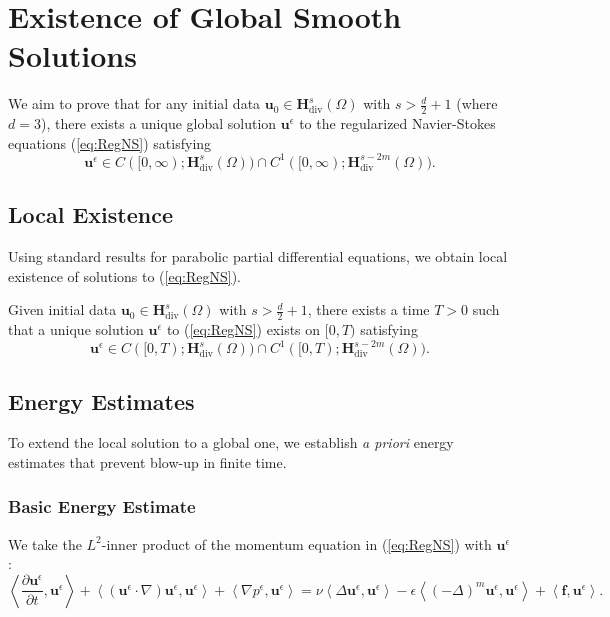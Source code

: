 \documentclass[11pt]{article}
\begin{document}
\section{Existence of Global Smooth Solutions}

We aim to prove that for any initial data $\mathbf{u}_0 \in \mathbf{H}^s_{\text{div}}(\Omega)$ with $s > \frac{d}{2} + 1$ (where $d=3$), there exists a unique global solution $\mathbf{u}^\epsilon$ to the regularized Navier-Stokes equations (\ref{eq:RegNS}) satisfying
\begin{equation}
\mathbf{u}^\epsilon \in C([0, \infty); \mathbf{H}^s_{\text{div}}(\Omega)) \cap C^1([0, \infty); \mathbf{H}^{s - 2m}_{\text{div}}(\Omega)).
\end{equation}

\subsection{Local Existence}

Using standard results for parabolic partial differential equations, we obtain local existence of solutions to (\ref{eq:RegNS}).

\begin{theorem}
Given initial data $\mathbf{u}_0 \in \mathbf{H}^s_{\text{div}}(\Omega)$ with $s > \frac{d}{2} + 1$, there exists a time $T > 0$ such that a unique solution $\mathbf{u}^\epsilon$ to (\ref{eq:RegNS}) exists on $[0, T)$ satisfying
\begin{equation}
\mathbf{u}^\epsilon \in C([0, T); \mathbf{H}^s_{\text{div}}(\Omega)) \cap C^1([0, T); \mathbf{H}^{s - 2m}_{\text{div}}(\Omega)).
\end{equation}
\end{theorem}  %

\subsection{Energy Estimates}

To extend the local solution to a global one, we establish \textit{a priori} energy estimates that prevent blow-up in finite time.

\subsubsection{Basic Energy Estimate}

We take the $L^2$-inner product of the momentum equation in (\ref{eq:RegNS}) with $\mathbf{u}^\epsilon$:
\begin{equation}
\left\langle \frac{\partial \mathbf{u}^\epsilon}{\partial t}, \mathbf{u}^\epsilon \right\rangle + \left\langle (\mathbf{u}^\epsilon \cdot \nabla) \mathbf{u}^\epsilon, \mathbf{u}^\epsilon \right\rangle + \left\langle \nabla p^\epsilon, \mathbf{u}^\epsilon \right\rangle = \nu \left\langle \Delta \mathbf{u}^\epsilon, \mathbf{u}^\epsilon \right\rangle - \epsilon \left\langle (-\Delta)^m \mathbf{u}^\epsilon, \mathbf{u}^\epsilon \right\rangle + \left\langle \mathbf{f}, \mathbf{u}^\epsilon \right\rangle.
\end{equation}  %
\end{document}

